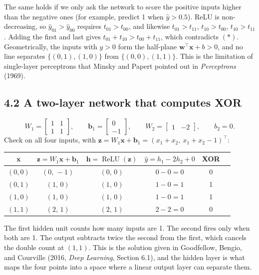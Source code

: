 \documentclass[11pt]{article}
\DeclareMathOperator{\ReLU}{ReLU}
\begin{document}
The same holds if we only ask the network to score the positive inputs higher than the negative ones (for example, predict 1 when $\hat y > 0.5$). ReLU is non-decreasing, so $\hat y_{01} > \hat y_{00}$ requires $t_{01} > t_{00}$, and likewise $t_{01} > t_{11}$, $t_{10} > t_{00}$, $t_{10} > t_{11}$. Adding the first and last gives $t_{01}+t_{10} > t_{00}+t_{11}$, which contradicts $(\ast)$. Geometrically, the inputs with $\hat y > 0$ form the half-plane $\mathbf{w}^\top\mathbf{x}+b>0$, and no line separates $\{(0,1),(1,0)\}$ from $\{(0,0),(1,1)\}$. This is the limitation of single-layer perceptrons that Minsky and Papert pointed out in \emph{Perceptrons} (1969).

\subsection*{4.2 A two-layer network that computes XOR}
\[
W_1 = \begin{bmatrix}1 & 1\\ 1 & 1\end{bmatrix},\qquad
\mathbf{b}_1 = \begin{bmatrix}0\\ -1\end{bmatrix},\qquad
W_2 = \begin{bmatrix}1 & -2\end{bmatrix},\qquad
b_2 = 0 .
\]
Check on all four inputs, with $\mathbf{z} = W_1\mathbf{x}+\mathbf{b}_1 = (x_1+x_2,\ x_1+x_2-1)^\top$:
\begin{center}\small
\begin{tabular}{cccccc}
\toprule
$\mathbf{x}$ & $\mathbf{z} = W_1\mathbf{x}+\mathbf{b}_1$ & $\mathbf{h} = \ReLU(\mathbf{z})$ & $\hat y = h_1 - 2h_2 + 0$ & XOR \\
\midrule
$(0,0)$ & $(0,\,-1)$ & $(0,\,0)$ & $0 - 0 = 0$ & 0\\
$(0,1)$ & $(1,\,0)$ & $(1,\,0)$ & $1 - 0 = 1$ & 1\\
$(1,0)$ & $(1,\,0)$ & $(1,\,0)$ & $1 - 0 = 1$ & 1\\
$(1,1)$ & $(2,\,1)$ & $(2,\,1)$ & $2 - 2 = 0$ & 0\\
\bottomrule
\end{tabular}
\end{center}
The first hidden unit counts how many inputs are 1. The second fires only when both are 1. The output subtracts twice the second from the first, which cancels the double count at $(1,1)$. This is the solution given in Goodfellow, Bengio, and Courville (2016, \emph{Deep Learning}, Section 6.1), and the hidden layer is what maps the four points into a space where a linear output layer can separate them.
\end{document}

